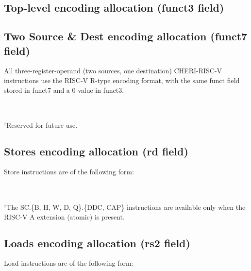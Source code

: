{	\subsection*{Top-level encoding allocation (funct3 field)}
	{\rvcherienctablefontsize
	\rvcherienctabletop
	}

	\subsection*{Two Source \& Dest encoding allocation (funct7 field)}
	All three-register-operand (two sources, one destination) CHERI-RISC-V instructions use the RISC-V R-type encoding format, with the same funct field stored in funct7 and a 0 value in funct3.

	\vspace{1em}


	\vspace{1em}

	{\rvcherienctablefontsize
	\def\rvcherireservedfootnotemark{$^\dagger$}
	\rvcherienctablesrcsrcdest\\\\
	\footnotesize
	$^\dagger$Reserved for future use.
	}

	\subsection*{Stores encoding allocation  (rd field)}
	Store instructions are of the following form:
	\vspace{1em}

	\rvcheriheader

	\vspace{1em}

	{\rvcherienctablefontsize
	\def\rvcheriatomicfootnotemark{$^\dagger$}
	\rvcherienctableexpstore\\\\
	\footnotesize
	$^\dagger$The SC.\{B, H, W, D, Q\}.\{DDC, CAP\} instructions are available only when the RISC-V A extension (atomic) is present.
	}

	\vspace{1em}

	\subsection*{Loads encoding allocation  (rs2 field)}
	Load instructions are of the following form:
	\vspace{1em}

}
